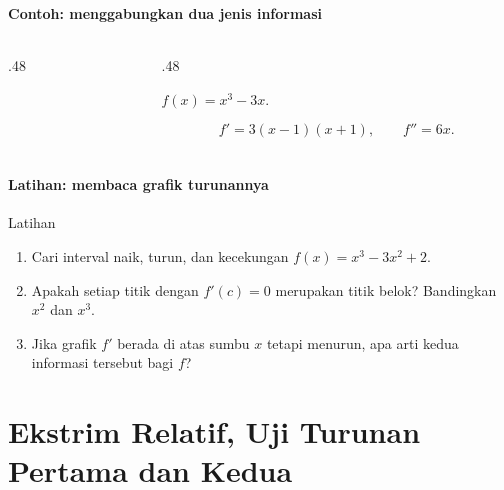 \documentclass{../../kalkulus-ppt}
\begin{document}
\begin{frame}
\frametitle{\insertsection}
\framesubtitle{Contoh: menggabungkan dua jenis informasi}
\begin{columns}[c]
\begin{column}{.48\textwidth}
\centering{}
\end{column}
\begin{column}{.48\textwidth}

\begin{contoh}$f(x)=x^3-3x$.\end{contoh}
\[f'=3(x-1)(x+1),\qquad f''=6x.\]
\end{column}
\end{columns}
\end{frame}

\begin{frame}
\frametitle{\insertsection}
\framesubtitle{Latihan: membaca grafik turunannya}

\begin{exampleblock}{Latihan}
\begin{enumerate}
\item Cari interval naik, turun, dan kecekungan $f(x)=x^3-3x^2+2$.
\item Apakah setiap titik dengan $f'(c)=0$ merupakan titik belok? Bandingkan $x^2$ dan $x^3$.
\item Jika grafik $f'$ berada di atas sumbu $x$ tetapi menurun, apa arti kedua informasi tersebut bagi $f$?
\end{enumerate}\end{exampleblock}
\end{frame}

\section{Ekstrim Relatif, Uji Turunan Pertama dan Kedua}
\end{document}
